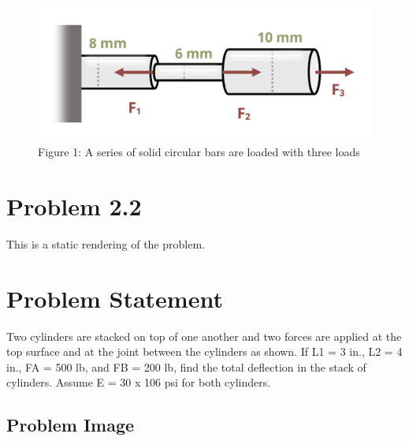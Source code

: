 \documentclass[
  letterpaper,
  DIV=11,
  numbers=noendperiod]{scrreprt}
\begin{document}
\begin{figure}[H]

{\centering \includegraphics{images/138.png}

}

\caption{Figure 1: A series of solid circular bars are loaded with three
loads}

\end{figure}%

\chapter*{Problem 2.2}\label{problem-2.2-1}


This is a static rendering of the problem.

\chapter*{Problem Statement}\label{problem-statement-1}


Two cylinders are stacked on top of one another and two forces are
applied at the top surface and at the joint between the cylinders as
shown. If L1 = 3 in., L2 = 4 in., FA = 500 lb, and FB = 200 lb, find the
total deflection in the stack of cylinders. Assume E = 30 x 106 psi for
both cylinders.

\section*{Problem Image}\label{problem-image-11}

\end{document}
